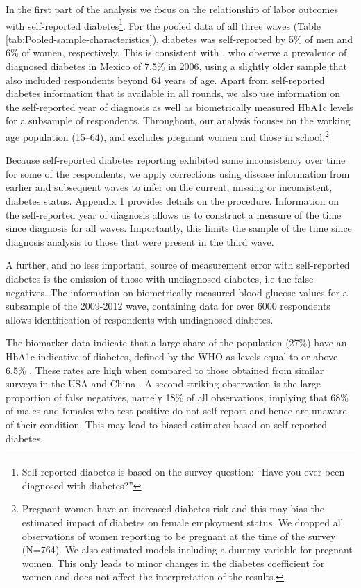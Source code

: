 \documentclass[12pt,english]{article}
\begin{document}
In the first part of the analysis we focus on the relationship of labor outcomes with self-reported diabetes\footnote{Self-reported diabetes is based on the survey question: “Have you ever been diagnosed with diabetes?”}. For the pooled data of all three waves (Table \ref{tab:Pooled-sample-characteristics}), diabetes was self-reported by 5\% of men and 6\% of women, respectively. This is consistent with \textcite{Barquera2013}, who observe a prevalence of diagnosed diabetes in Mexico of 7.5\% in 2006, using a slightly older sample that also included respondents beyond 64 years of age. Apart from self-reported diabetes information that is available in all rounds, we also use information on the self-reported year of diagnosis as well as biometrically measured \ac{HbA1c} levels for a subsample of respondents. Throughout, our analysis focuses on the working age population (15–64), and excludes pregnant women and those in school.\footnote{Pregnant women have an increased diabetes risk and this may bias the estimated impact of diabetes on female employment status. We dropped all observations of women reporting to be pregnant at the time of the survey (N=764). We also estimated models including a dummy variable for pregnant women. This only leads to minor changes in the diabetes coefficient for women and does not affect the interpretation of the results.}

Because self-reported diabetes reporting exhibited some inconsistency over time for some of the respondents, we apply corrections using disease information from earlier and subsequent waves to infer on the current, missing or inconsistent, diabetes status. Appendix 1 provides details on the procedure. Information on the self-reported year of diagnosis allows us to construct a measure of the time since diagnosis for all waves. Importantly, this limits the sample of the time since diagnosis analysis to those that were present in the third wave. 

A further, and no less important, source of measurement error with self-reported diabetes is the omission of those with undiagnosed diabetes, i.e the false negatives. The information on biometrically measured blood glucose values for a subsample of the 2009-2012 wave, containing data for over 6000 respondents allows identification of respondents with undiagnosed diabetes. 

The biomarker data indicate that a large share of the population (27\%) have an \ac{HbA1c} indicative of diabetes, defined by the \ac{WHO} as levels equal to or above 6.5\% \parencite{WorldHealthOrganization2011}. These rates are high when compared to those obtained from similar surveys in the USA and China \parencite{Frankenberg2015}. A second striking observation is the large proportion of false negatives, namely 18\% of all observations, implying that 68\% of males and females who test positive do not self-report and hence are unaware of their condition. This may lead to biased estimates based on self-reported diabetes.
\end{document}
